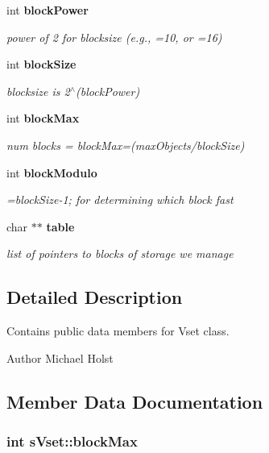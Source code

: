 \begin{DoxyCompactItemize}
int {\bf block\+Power}
\begin{DoxyCompactList}\small\item\em power of 2 for blocksize (e.\+g., =10, or =16) \end{DoxyCompactList}\item 
int {\bf block\+Size}
\begin{DoxyCompactList}\small\item\em blocksize is 2$^\wedge$(block\+Power) \end{DoxyCompactList}\item 
int {\bf block\+Max}
\begin{DoxyCompactList}\small\item\em num blocks = block\+Max=(max\+Objects/block\+Size) \end{DoxyCompactList}\item 
int {\bf block\+Modulo}
\begin{DoxyCompactList}\small\item\em =block\+Size-\/1; for determining which block fast \end{DoxyCompactList}\item 
char $\ast$$\ast$ {\bf table}
\begin{DoxyCompactList}\small\item\em list of pointers to blocks of storage we manage \end{DoxyCompactList}\end{DoxyCompactItemize}


\subsection{Detailed Description}
Contains public data members for Vset class. 

\begin{DoxyAuthor}{Author}
Michael Holst 
\end{DoxyAuthor}


\subsection{Member Data Documentation}
\subsubsection[{block\+Max}]{\setlength{\rightskip}{0pt plus 5cm}int s\+Vset\+::block\+Max}\label{a00006_aa9dd2d95c9e71f01b9f6a0e8c240621a}


